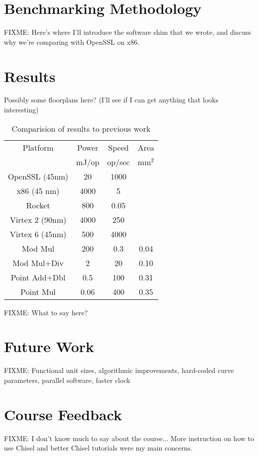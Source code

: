 \documentclass[twocolumn]{article}
\begin{document}
\section{Benchmarking Methodology}

FIXME: Here's where I'll introduce the software shim that we wrote,
and discuss why we're comparing with OpenSSL on x86.

\section{Results}

Possibly some floorplans here?
(I'll see if I can get anything that looks interesting)

\begin{table}[ht]
  \begin{center}
    \begin{tabular}{c|ccc}
      Platform        & Power & Speed  & Area \\
                      & mJ/op & op/sec & mm$^2$ \\
      \hline
      OpenSSL (45nm)  & 20    & 1000   &      \\
      x86 (45 nm)     & 4000  & 5      &      \\
      Rocket          & 800   & 0.05   &      \\
      Virtex 2 (90nm) & 4000  & 250    &      \\
      Virtex 6 (45nm) & 500   & 4000   &      \\
      \hline
      Mod Mul         & 200   & 0.3    & 0.04 \\
      Mod Mul+Div     & 2     & 20     & 0.10 \\
      Point Add+Dbl   & 0.5   & 100    & 0.31 \\
      Point Mul       & 0.06  & 400    & 0.35 \\
    \end{tabular}
  \end{center}

  \caption{Comparision of results to previous work
    \label{results}}
\end{table}

FIXME: What to say here?

\section{Future Work}

FIXME: Functional unit sizes, algorithmic improvements, hard-coded
curve parameters, parallel software, faster clock



\section{Course Feedback}

FIXME: I don't know much to say about the course... More instruction on how to use Chisel
and better Chisel tutorials were my main concerns.



\end{document}
